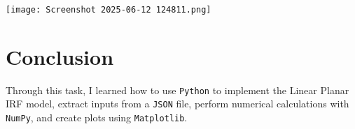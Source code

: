\documentclass{article}
\begin{document}
\begin{enumerate}
    \texttt{[image: Screenshot 2025-06-12 124811.png]}

\section{Conclusion}
Through this task, I learned how to use \texttt{Python} to implement the Linear Planar IRF model, extract inputs from a \texttt{JSON} file, perform numerical calculations with \texttt{NumPy}, and create plots using \texttt{Matplotlib}. 
    
\end{enumerate}
\end{document}
